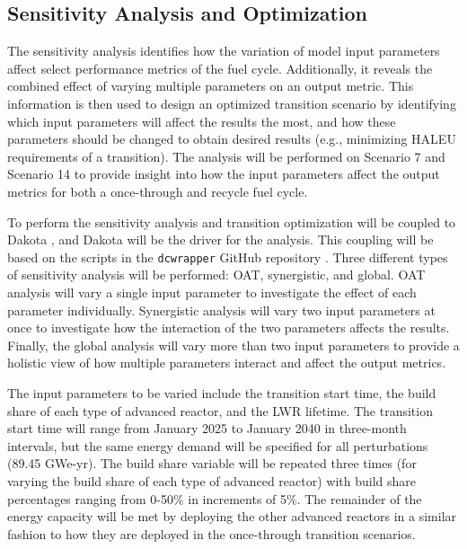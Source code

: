 

\subsection{Sensitivity Analysis and Optimization}
The sensitivity analysis identifies how the variation of model input
parameters affect select performance 
metrics of the fuel cycle. Additionally, it reveals the combined effect 
of varying multiple parameters on 
an output metric. This information is then used to design 
an optimized transition scenario by identifying which input parameters 
will affect the results the most, and how these parameters should be 
changed to obtain desired results (e.g., minimizing \gls{HALEU} requirements
of a transition). The analysis will be performed on Scenario 7 and Scenario 
14 to provide insight into how the input parameters affect the output 
metrics for both a once-through and recycle fuel cycle. 

To perform the sensitivity analysis and 
transition optimization \Cyclus will be coupled to Dakota \cite{adams_dakota_2019},
and Dakota will be the driver for the analysis. This coupling will be based on 
the scripts in the \texttt{dcwrapper} GitHub repository \cite{chee_arfc/dcwrapper_2019}.
Three different types 
of sensitivity analysis will be performed: \acrfull{OAT}, synergistic, 
and global. \gls{OAT} analysis will vary a single input parameter to 
investigate the effect of each parameter individually. Synergistic 
analysis will vary two input parameters at once to investigate how the 
interaction of the two parameters affects the results. Finally, the global 
analysis will vary more than two input parameters to provide a holistic 
view of how multiple parameters interact and affect the output metrics. 

The input parameters to be varied include the transition 
start time, the build share of each type of advanced reactor, and 
the \gls{LWR} lifetime. The transition start time will range from January 
2025 to January 2040 in three-month intervals, but the same energy demand 
will be specified for all perturbations (89.45 GWe-yr). The build share 
variable will be repeated three times (for varying the build share of each 
type of advanced reactor) with build share percentages ranging from 0-50\% 
in increments of 5\%. The remainder of the energy capacity will be met by 
deploying the other advanced reactors in a similar fashion to how they 
are deployed in the once-through transition scenarios. 

